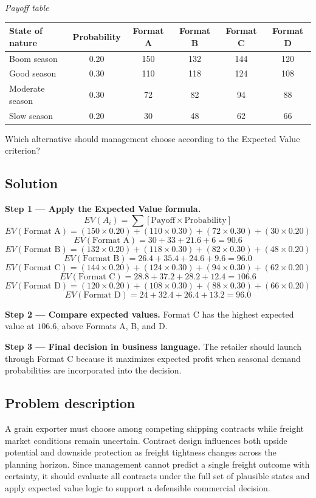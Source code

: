 \begin{ExamProblems}
		\begin{center}
			\textit{Payoff table} \par
			\begin{tabular}{l c c c c c}
				\toprule
				State of nature & Probability & Format A & Format B & Format C & Format D \\
				\midrule
				Boom season & 0.20 & 150 & 132 & 144 & 120 \\
				Good season & 0.30 & 110 & 118 & 124 & 108 \\
				Moderate season & 0.30 & 72 & 82 & 94 & 88 \\
				Slow season & 0.20 & 30 & 48 & 62 & 66 \\
				\bottomrule
			\end{tabular}
		\end{center}

		Which alternative should management choose according to the Expected Value criterion?

		\subsection*{Solution}
		\textbf{Step 1 --- Apply the Expected Value formula.}
		\[
		EV(A_i)=\sum [\text{Payoff}\times\text{Probability}]
		\]
		\[
		EV(\text{Format A})=(150\times0.20)+(110\times0.30)+(72\times0.30)+(30\times0.20)
		\]
		\[
		EV(\text{Format A})=30+33+21.6+6=90.6
		\]
		\[
		EV(\text{Format B})=(132\times0.20)+(118\times0.30)+(82\times0.30)+(48\times0.20)
		\]
		\[
		EV(\text{Format B})=26.4+35.4+24.6+9.6=96.0
		\]
		\[
		EV(\text{Format C})=(144\times0.20)+(124\times0.30)+(94\times0.30)+(62\times0.20)
		\]
		\[
		EV(\text{Format C})=28.8+37.2+28.2+12.4=106.6
		\]
		\[
		EV(\text{Format D})=(120\times0.20)+(108\times0.30)+(88\times0.30)+(66\times0.20)
		\]
		\[
		EV(\text{Format D})=24+32.4+26.4+13.2=96.0
		\]
		
		\textbf{Step 2 --- Compare expected values.}
		Format C has the highest expected value at $106.6$, above Formats A, B, and D.
		
		\textbf{Step 3 --- Final decision in business language.}
		The retailer should launch through Format C because it maximizes expected profit when seasonal demand probabilities are incorporated into the decision.		\item
		\subsection*{Problem description}
		A grain exporter must choose among competing shipping contracts while freight market conditions remain uncertain. Contract design influences both upside potential and downside protection as freight tightness changes across the planning horizon. Since management cannot predict a single freight outcome with certainty, it should evaluate all contracts under the full set of plausible states and apply expected value logic to support a defensible commercial decision.


\end{ExamProblems}
